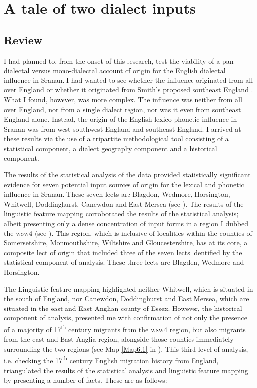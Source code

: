 \chapter{A tale of two dialect inputs}\label{ch:7}

\section{Review}\label{7.1}
I had planned to, from the onset of this research, test the viability of a pan-dialectal versus mono-dialectal account of origin for the English dialectal influence in Sranan. I had wanted to see whether the influence originated from all over England or whether it originated from Smith's  proposed southeast England \citep{Smith87, Smith08}. What I found, however, was more complex. The influence was neither from all over England, nor from a single dialect region, nor was it even from southeast England alone. Instead, the origin of the English lexico-phonetic influence in Sranan was from west-southwest England and southeast England. I arrived at these results via the use of a tripartite methodological tool consisting of a statistical component, a dialect geography component and a historical component.

The results of the statistical analysis of the data provided statistically significant evidence for seven potential input sources of origin for the lexical and phonetic influence in Sranan. These seven lects are Blagdon, Wedmore, Horsington, Whitwell, Doddinghurst, Canewdon and East Mersea (see ). The results of the linguistic feature mapping corroborated the results of the statistical analysis; albeit presenting only a dense concentration of input forms in a region I dubbed the \textsc{wsw4} (see ). This region, which is inclusive of localities within the counties of Somersetshire, Monmouthshire, Wiltshire and Gloucestershire, has at its core, a composite lect of origin that included three of the seven lects identified by the statistical component of analysis. These three lects are Blagdon, Wedmore and Horsington.

The Linguistic feature mapping highlighted neither Whitwell, which is situated in the south of England, nor Canewdon, Doddinghurst and East Mersea, which are situated in the east and East Anglian county of Essex. However, the historical component of analysis, presented me with confirmation of not only the presence of a majority of 17\textsuperscript{th} century migrants from the \textsc{wsw4} region, but also migrants from the east and East Anglia region, alongside those counties immediately surrounding the two regions (see Map \ref{Map6.1} in ). This third level of analysis, i.e. checking the 17\textsuperscript{th} century English migration history from England, triangulated the results of the statistical analysis and linguistic feature mapping by presenting a number of facts. These are as follows:

